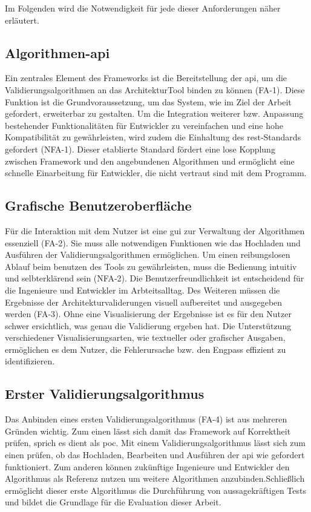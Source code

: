 Im Folgenden wird die Notwendigkeit für jede dieser Anforderungen näher erläutert.

\subsection*{Algorithmen-\gls{api}}

Ein zentrales Element des Frameworks ist die Bereitstellung der \gls{api}, um die Validierungsalgorithmen an das ArchitekturTool binden zu können (FA-1). Diese Funktion ist die Grundvoraussetzung, um das System, wie im Ziel der Arbeit gefordert, erweiterbar zu gestalten. Um die Integration weiterer bzw. Anpassung bestehender Funktionalitäten für Entwickler zu vereinfachen und eine hohe Kompatibilität zu gewährleisten, wird zudem die Einhaltung des \gls{rest}-Standards gefordert (NFA-1). Dieser etablierte Standard fördert eine lose Kopplung zwischen Framework und den angebundenen Algorithmen und ermöglicht eine schnelle Einarbeitung für Entwickler, die nicht vertraut sind mit dem Programm.

\subsection*{Grafische Benutzeroberfläche}

Für die Interaktion mit dem Nutzer ist eine \gls{gui} zur Verwaltung der Algorithmen essenziell (FA-2). Sie muss alle notwendigen Funktionen wie das Hochladen und Ausführen der Validierungsalgorithmen ermöglichen. Um einen reibungslosen Ablauf beim benutzen des Tools zu gewährleisten, muss die Bedienung intuitiv und selbterklärend sein (NFA-2). Die Benutzerfreundlichkeit ist entscheidend für die Ingenieure und Entwickler im Arbteitsalltag. Des Weiteren müssen die Ergebnisse der Architekturvaliderungen visuell aufbereitet und ausgegeben werden (FA-3). Ohne eine Visualisierung der Ergebnisse ist es für den Nutzer schwer ersichtlich, was genau die Validierung ergeben hat. Die Unterstützung verschiedener Visualisierungsarten, wie textueller oder grafischer Ausgaben, ermöglichen es dem Nutzer, die Fehlerursache bzw. den Engpass effizient zu identifizieren.

\subsection*{Erster Validierungsalgorithmus}

Das Anbinden eines ersten Validierungsalgorithmus (FA-4) ist aus mehreren Gründen wichtig. Zum einen lässt sich damit das Framework auf Korrektheit prüfen, sprich es dient als \gls{poc}. Mit einem Validierungsalgorithmus lässt sich zum einen prüfen, ob das Hochladen, Bearbeiten und Ausführen der \gls{api} wie gefordert funktioniert. Zum anderen können  zukünftige Ingenieure und Entwickler den Algorithmus als Referenz nutzen um weitere Algorithmen anzubinden.Schließlich ermöglicht dieser erste Algorithmus die Durchführung von aussagekräftigen Tests und bildet die Grundlage für die Evaluation dieser Arbeit.


